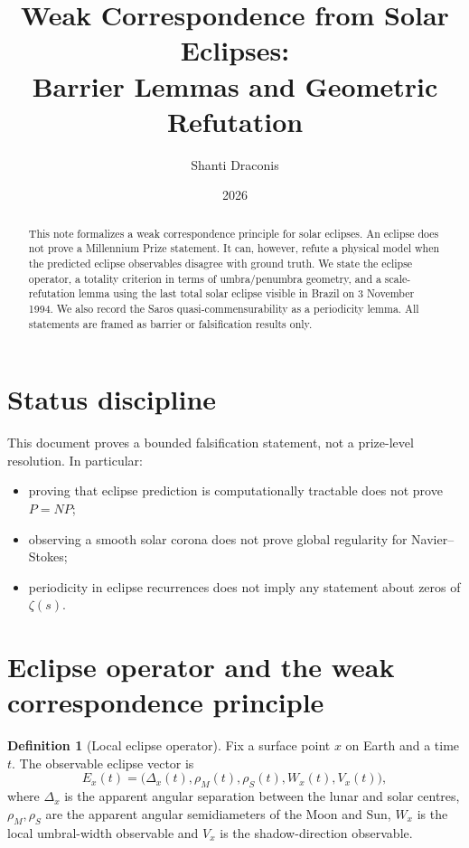\documentclass[11pt]{article}
\title{Weak Correspondence from Solar Eclipses:\\
Barrier Lemmas and Geometric Refutation}
\author{Shanti Draconis}
\date{2026}
\theoremstyle{definition}
\newtheorem{definition}[theorem]{Definition}
\theoremstyle{remark}
\begin{document}
\maketitle

\begin{abstract}
This note formalizes a weak correspondence principle for solar eclipses.
An eclipse does not prove a Millennium Prize statement. It can, however,
refute a physical model when the predicted eclipse observables disagree with
ground truth. We state the eclipse operator, a totality criterion in terms of
umbra/penumbra geometry, and a scale-refutation lemma using the last total
solar eclipse visible in Brazil on 3 November 1994. We also record the Saros
quasi-commensurability as a periodicity lemma. All statements are framed as
barrier or falsification results only.
\end{abstract}

\section{Status discipline}

This document proves a bounded falsification statement, not a prize-level
resolution. In particular:
\begin{itemize}
  \item proving that eclipse prediction is computationally tractable does not
  prove \(P=NP\);
  \item observing a smooth solar corona does not prove global regularity for
  Navier--Stokes;
  \item periodicity in eclipse recurrences does not imply any statement about
  zeros of \(\zeta(s)\).
\end{itemize}

\section{Eclipse operator and the weak correspondence principle}

\begin{definition}[Local eclipse operator]
Fix a surface point \(x\) on Earth and a time \(t\). The observable eclipse
vector is
\[
E_x(t)=\bigl(\Delta_x(t),\rho_M(t),\rho_S(t),W_x(t),V_x(t)\bigr),
\]
where \(\Delta_x\) is the apparent angular separation between the lunar and
solar centres, \(\rho_M,\rho_S\) are the apparent angular semidiameters of the
Moon and Sun, \(W_x\) is the local umbral-width observable and \(V_x\) is the
shadow-direction observable.
\end{definition}
\end{document}

